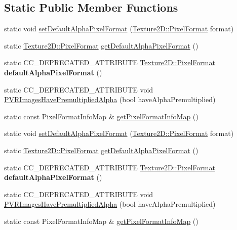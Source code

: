 \subsection*{Static Public Member Functions}
\begin{DoxyCompactItemize}
\item 
static void \hyperlink{classTexture2D_ac624647313a211073d20a29a07d01622}{set\+Default\+Alpha\+Pixel\+Format} (\hyperlink{classTexture2D_a45d9d8bb5a0669def36bbdfbfb91d220}{Texture2\+D\+::\+Pixel\+Format} format)
\item 
static \hyperlink{classTexture2D_a45d9d8bb5a0669def36bbdfbfb91d220}{Texture2\+D\+::\+Pixel\+Format} \hyperlink{classTexture2D_ab08c2f098f96cc9549fd583177ac9971}{get\+Default\+Alpha\+Pixel\+Format} ()
\item 
\mbox{\label{classTexture2D_aa2a23302278277037c06d0018e5900dc}} 
static C\+C\+\_\+\+D\+E\+P\+R\+E\+C\+A\+T\+E\+D\+\_\+\+A\+T\+T\+R\+I\+B\+U\+TE \hyperlink{classTexture2D_a45d9d8bb5a0669def36bbdfbfb91d220}{Texture2\+D\+::\+Pixel\+Format} {\bfseries default\+Alpha\+Pixel\+Format} ()
\item 
static C\+C\+\_\+\+D\+E\+P\+R\+E\+C\+A\+T\+E\+D\+\_\+\+A\+T\+T\+R\+I\+B\+U\+TE void \hyperlink{classTexture2D_a62ab6fca303a92c550ad28fafd52bb6e}{P\+V\+R\+Images\+Have\+Premultiplied\+Alpha} (bool have\+Alpha\+Premultiplied)
\item 
static const Pixel\+Format\+Info\+Map \& \hyperlink{classTexture2D_a2c619bc5157360bd84af422b68397328}{get\+Pixel\+Format\+Info\+Map} ()
\item 
static void \hyperlink{classTexture2D_ae384caf70dece31466fa989f2640a33a}{set\+Default\+Alpha\+Pixel\+Format} (\hyperlink{classTexture2D_a45d9d8bb5a0669def36bbdfbfb91d220}{Texture2\+D\+::\+Pixel\+Format} format)
\item 
static \hyperlink{classTexture2D_a45d9d8bb5a0669def36bbdfbfb91d220}{Texture2\+D\+::\+Pixel\+Format} \hyperlink{classTexture2D_ae7e9ce2ec2a62fafe9e25c96f24a57bb}{get\+Default\+Alpha\+Pixel\+Format} ()
\item 
\mbox{\label{classTexture2D_aa2a23302278277037c06d0018e5900dc}} 
static C\+C\+\_\+\+D\+E\+P\+R\+E\+C\+A\+T\+E\+D\+\_\+\+A\+T\+T\+R\+I\+B\+U\+TE \hyperlink{classTexture2D_a45d9d8bb5a0669def36bbdfbfb91d220}{Texture2\+D\+::\+Pixel\+Format} {\bfseries default\+Alpha\+Pixel\+Format} ()
\item 
static C\+C\+\_\+\+D\+E\+P\+R\+E\+C\+A\+T\+E\+D\+\_\+\+A\+T\+T\+R\+I\+B\+U\+TE void \hyperlink{classTexture2D_ae7ffb5940ab10a05213b85456eafff2f}{P\+V\+R\+Images\+Have\+Premultiplied\+Alpha} (bool have\+Alpha\+Premultiplied)
\item 
static const Pixel\+Format\+Info\+Map \& \hyperlink{classTexture2D_abe771002b23ab001b927696754828b1f}{get\+Pixel\+Format\+Info\+Map} ()
\end{DoxyCompactItemize}
